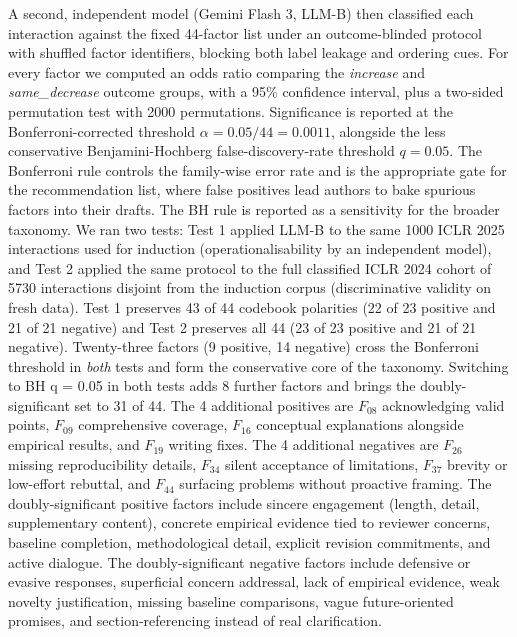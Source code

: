 \documentclass{article}
\begin{document}
A second, independent model (Gemini Flash 3, LLM-B) then classified each interaction against the fixed 44-factor list under an outcome-blinded protocol with shuffled factor identifiers, blocking both label leakage and ordering cues. For every factor we computed an odds ratio comparing the \emph{increase} and \emph{same\_decrease} outcome groups, with a 95\% confidence interval, plus a two-sided permutation test with 2000 permutations. Significance is reported at the Bonferroni-corrected threshold $\alpha = 0.05/44 = 0.0011$, alongside the less conservative Benjamini-Hochberg false-discovery-rate threshold $q = 0.05$. The Bonferroni rule controls the family-wise error rate and is the appropriate gate for the recommendation list, where false positives lead authors to bake spurious factors into their drafts. The BH rule is reported as a sensitivity for the broader taxonomy. We ran two tests: Test 1 applied LLM-B to the same \num{1000} ICLR 2025 interactions used for induction (operationalisability by an independent model), and Test 2 applied the same protocol to the full classified ICLR 2024 cohort of \num{5730} interactions disjoint from the induction corpus (discriminative validity on fresh data). Test 1 preserves 43 of 44 codebook polarities (22 of 23 positive and 21 of 21 negative) and Test 2 preserves all 44 (23 of 23 positive and 21 of 21 negative). Twenty-three factors (9 positive, 14 negative) cross the Bonferroni threshold in \emph{both} tests and form the conservative core of the taxonomy. Switching to BH q = 0.05 in both tests adds 8 further factors and brings the doubly-significant set to 31 of 44. The 4 additional positives are $F_{08}$ acknowledging valid points, $F_{09}$ comprehensive coverage, $F_{16}$ conceptual explanations alongside empirical results, and $F_{19}$ writing fixes. The 4 additional negatives are $F_{26}$ missing reproducibility details, $F_{34}$ silent acceptance of limitations, $F_{37}$ brevity or low-effort rebuttal, and $F_{44}$ surfacing problems without proactive framing. The doubly-significant positive factors include sincere engagement (length, detail, supplementary content), concrete empirical evidence tied to reviewer concerns, baseline completion, methodological detail, explicit revision commitments, and active dialogue. The doubly-significant negative factors include defensive or evasive responses, superficial concern addressal, lack of empirical evidence, weak novelty justification, missing baseline comparisons, vague future-oriented promises, and section-referencing instead of real clarification.
\end{document}
